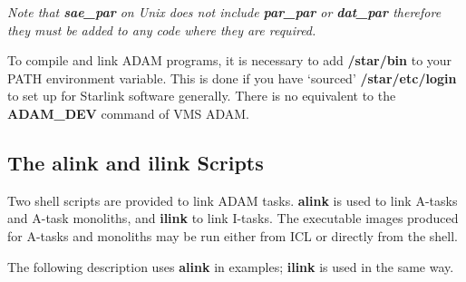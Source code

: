 {\em Note that {\bf sae\_par} on Unix does not include {\bf par\_par} or 
{\bf dat\_par} therefore they must be added to any code where they are 
required.}

To compile and link ADAM programs, it is necessary to add {\bf /star/bin} to 
your PATH environment variable. This is done if you have `sourced'
{\bf /star/etc/login} to set up for Starlink software generally. 
There is no equivalent to the {\bf ADAM\_DEV} command of VMS ADAM.

\subsection{The alink and ilink Scripts}
\label{link_scripts}
Two shell scripts are provided to link ADAM tasks.
{\bf alink} is used to link A-tasks and A-task monoliths, and {\bf ilink} to 
link I-tasks.
The executable images produced for A-tasks and monoliths may be run either
from ICL or directly from the shell. 

The following description uses {\bf alink} in examples; {\bf ilink} is used in
the same way.

